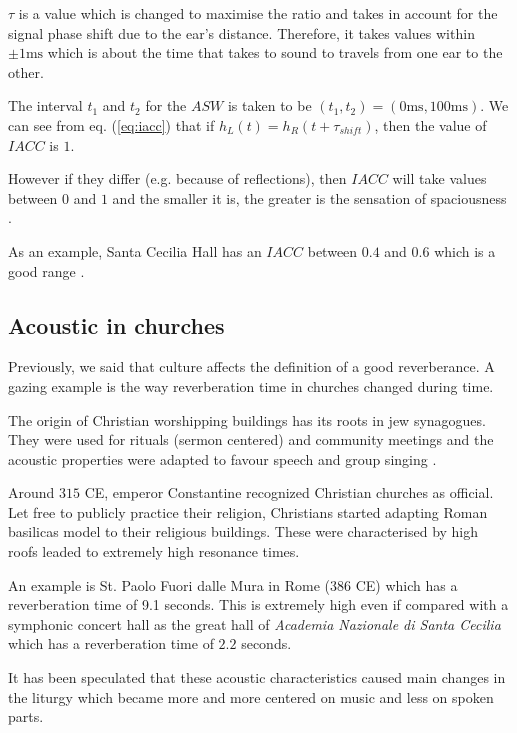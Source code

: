 \documentclass[a4paper]{article}
\begin{document}
$\tau$ is a value which is changed to maximise the ratio and takes in account for the signal phase shift due to the ear's distance. Therefore, it takes values within $\pm 1\mathrm{ms}$ which is about the time that takes to sound to travels from one ear to the other.

The interval $t_1$ and $t_2$ for the $ASW$  is taken to be $(t_1, t_2) = (0\mathrm{ms}, 100\mathrm{ms})$. We can see from eq. (\ref{eq:iacc}) that if $h_{L}(t)=h_{R}(t + \tau_{shift})$, then the value of $IACC$ is $1$.

However if they differ (e.g. because of reflections), then $IACC$ will take values between $0$ and $1$ and the smaller it is, the greater is the sensation of spaciousness \cite{book:acoustic}.

As an example, Santa Cecilia Hall has an $IACC$ between $0.4$ and $0.6$ which is a good range \cite{article:santa_cecilia_acoustic}.

\subsection{Acoustic in churches }
Previously, we said that culture affects the definition of a good reverberance. A gazing example is the way reverberation time in churches changed during time.

The origin of Christian worshipping buildings has its roots in jew synagogues. They were used for rituals (sermon centered) and community meetings and the acoustic properties were adapted to favour speech and group singing \cite{article:acoustic:churches}. 

Around  $315$ CE, emperor Constantine recognized Christian churches as official. Let free to publicly practice their religion, Christians started adapting Roman basilicas model to their religious buildings. These were characterised by high roofs leaded to  extremely high resonance times.

An example is St. Paolo Fuori dalle Mura in Rome ($386$ CE) which has a reverberation time of 9.1 seconds. This is extremely high even if compared with a symphonic concert hall as the great hall of \textit{Academia Nazionale di Santa Cecilia} which has a reverberation time of $2.2$ seconds.

It has been speculated \cite{article:acoustic:churches} \cite{article:acoustic:history} that these acoustic characteristics caused  main changes in the liturgy which became more and more centered on music and less on spoken parts.
\end{document}
